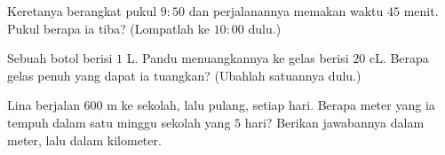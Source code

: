 \begin{exercise}[$\star$]\label{exo:g3:measure:9}
Keretanya berangkat pukul $9{:}50$ dan perjalanannya memakan waktu
$45$ menit. Pukul berapa ia tiba? (Lompatlah ke $10{:}00$ dulu.)
\end{exercise}

\begin{exercise}[$\star\star$]\label{exo:g3:measure:10}
Sebuah botol berisi $1$ L. Pandu menuangkannya ke gelas berisi $20$
cL. Berapa gelas penuh yang dapat ia tuangkan? (Ubahlah satuannya dulu.)
\end{exercise}

\begin{exercise}[$\star\star$]\label{exo:g3:measure:11}
Lina berjalan $600$ m ke sekolah, lalu pulang, setiap hari. Berapa
meter yang ia tempuh dalam satu minggu sekolah yang $5$ hari?
Berikan jawabannya dalam meter, lalu dalam kilometer.

\end{exercise}
